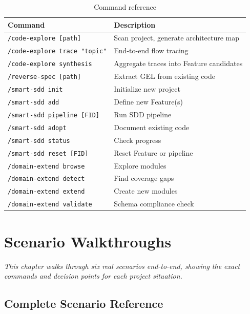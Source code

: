 \documentclass[11pt,a4paper,openright,twoside]{report}
\begin{document}
\begin{table}[H]
\centering
\caption{Command reference}
\label{tab:cli}
\begin{tabularx}{\textwidth}{lX}
\toprule
\textbf{Command} & \textbf{Description} \\
\midrule
\texttt{/code-explore [path]} & Scan project, generate architecture map \\
\texttt{/code-explore trace "topic"} & End-to-end flow tracing \\
\texttt{/code-explore synthesis} & Aggregate traces into Feature candidates \\
\texttt{/reverse-spec [path]} & Extract GEL from existing code \\
\texttt{/smart-sdd init} & Initialize new project \\
\texttt{/smart-sdd add} & Define new Feature(s) \\
\texttt{/smart-sdd pipeline [FID]} & Run SDD pipeline \\
\texttt{/smart-sdd adopt} & Document existing code \\
\texttt{/smart-sdd status} & Check progress \\
\texttt{/smart-sdd reset [FID]} & Reset Feature or pipeline \\
\texttt{/domain-extend browse} & Explore modules \\
\texttt{/domain-extend detect} & Find coverage gaps \\
\texttt{/domain-extend extend} & Create new modules \\
\texttt{/domain-extend validate} & Schema compliance check \\
\bottomrule
\end{tabularx}
\end{table}


\chapter{Scenario Walkthroughs}
\label{ch:scenarios}

\textit{This chapter walks through six real scenarios end-to-end, showing the exact commands and decision points for each project situation.}


\section{Complete Scenario Reference}
\label{sec:complete-scenario-reference}
\end{document}
